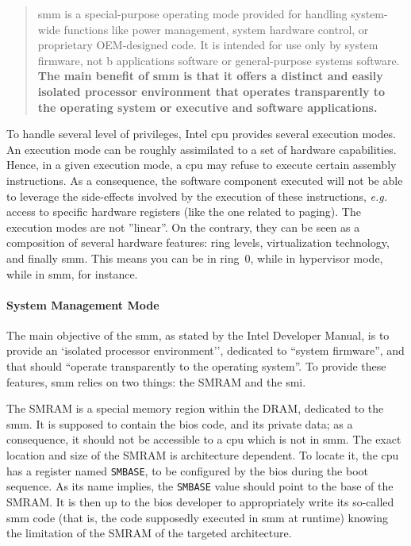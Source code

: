 \begin{quote}
  \ac{smm} is a special-purpose operating mode provided for handling system-wide
  functions like power management, system hardware control, or proprietary
  OEM-designed code.
  It is intended for use only by system firmware, not b applications software or
  general-purpose systems software.
  \textbf{The main benefit of \ac{smm} is that it offers a distinct and easily
    isolated processor environment that operates transparently to the operating
    system or executive and software applications.}
\end{quote}

To handle several level of privileges, Intel \ac{cpu} provides several execution
modes.
%
An execution mode can be roughly assimilated to a set of hardware capabilities.
%
Hence, in a given execution mode, a \ac{cpu} may refuse to execute certain
assembly instructions.
%
As a consequence, the software component executed will not be able to leverage
the side-effects involved by the execution of these instructions, \emph{e.g.}
access to specific hardware registers (like the one related to paging).
%
The execution modes are not ''linear''.
%
On the contrary, they can be seen as a composition of several hardware features:
ring levels, virtualization technology, and finally \ac{smm}.
%
This means you can be in ring~0, while in hypervisor mode, while in \ac{smm},
for instance.

\paragraph{System Management Mode}
%
The main objective of the \ac{smm}, as stated by the Intel Developer Manual, is
to provide an `isolated processor environment'', dedicated to ``system
firmware'', and that should ``operate transparently to the operating system''.
%
To provide these features, \ac{smm} relies on two things: the SMRAM and the
\ac{smi}.

The SMRAM is a special memory region within the DRAM, dedicated to the \ac{smm}.
%
It is supposed to contain the \ac{bios} code, and its private data;
%
as a consequence, it should not be accessible to a \ac{cpu} which is not in
\ac{smm}.
%
The exact location and size of the SMRAM is architecture dependent.
%
To locate it, the \ac{cpu} has a register named \texttt{SMBASE}, to be
configured by the \ac{bios} during the boot sequence.
%
As its name implies, the \texttt{SMBASE} value should point to the base of the
SMRAM.
%
It is then up to the \ac{bios} developer to appropriately write its so-called
\ac{smm} code (that is, the code supposedly executed in \ac{smm} at runtime)
knowing the limitation of the SMRAM of the targeted architecture.

